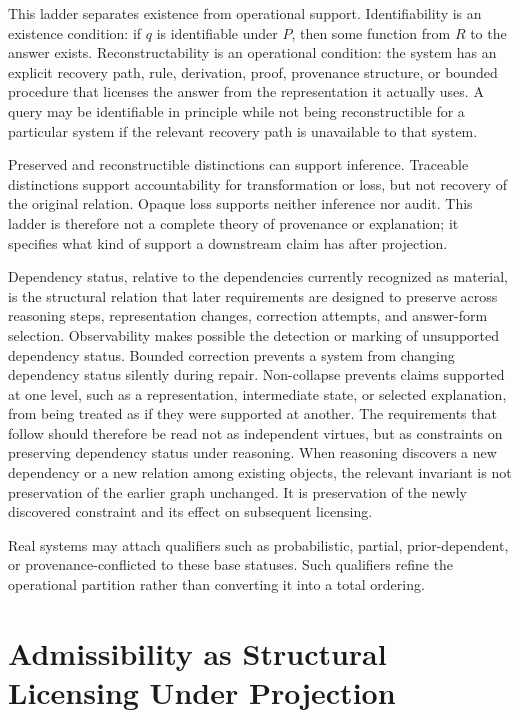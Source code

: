 \documentclass[11pt]{article}
\begin{document}
This ladder separates existence from operational support. Identifiability is an existence condition: if $q$ is identifiable under $P$, then some function from $R$ to the answer exists. Reconstructability is an operational condition: the system has an explicit recovery path, rule, derivation, proof, provenance structure, or bounded procedure that licenses the answer from the representation it actually uses. A query may be identifiable in principle while not being reconstructible for a particular system if the relevant recovery path is unavailable to that system.

Preserved and reconstructible distinctions can support inference. Traceable distinctions support accountability for transformation or loss, but not recovery of the original relation. Opaque loss supports neither inference nor audit. This ladder is therefore not a complete theory of provenance or explanation; it specifies what kind of support a downstream claim has after projection.

Dependency status, relative to the dependencies currently recognized as material, is the structural relation that later requirements are designed to preserve across reasoning steps, representation changes, correction attempts, and answer-form selection. Observability makes possible the detection or marking of unsupported dependency status. Bounded correction prevents a system from changing dependency status silently during repair. Non-collapse prevents claims supported at one level, such as a representation, intermediate state, or selected explanation, from being treated as if they were supported at another. The requirements that follow should therefore be read not as independent virtues, but as constraints on preserving dependency status under reasoning. When reasoning discovers a new dependency or a new relation among existing objects, the relevant invariant is not preservation of the earlier graph unchanged. It is preservation of the newly discovered constraint and its effect on subsequent licensing.

Real systems may attach qualifiers such as probabilistic, partial, prior-dependent, or provenance-conflicted to these base statuses. Such qualifiers refine the operational partition rather than converting it into a total ordering.

\section{Admissibility as Structural Licensing Under Projection}
\end{document}
